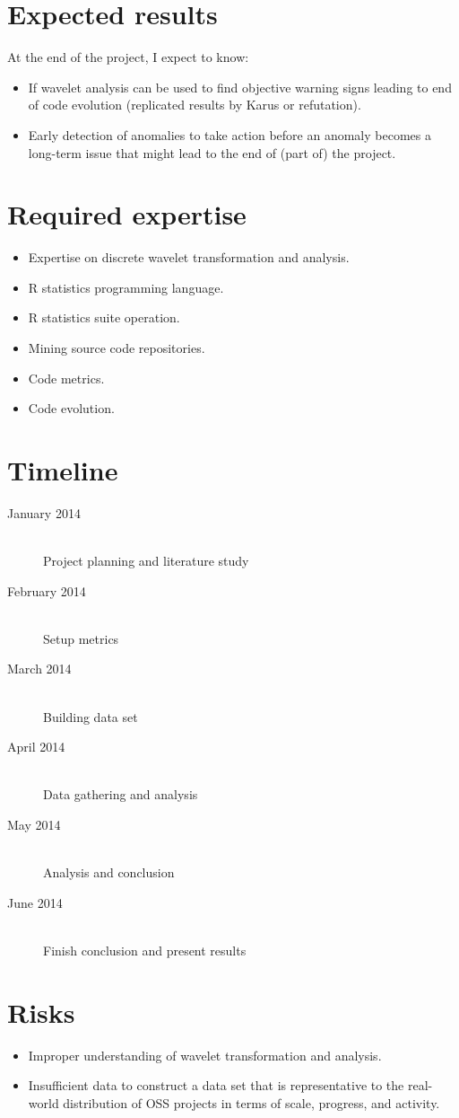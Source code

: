 


\section{Expected results}
At the end of the project, I expect to know:
\begin{itemize}
	\item If wavelet analysis can be used to find objective warning signs leading
	to end of code evolution (replicated results by Karus or refutation).
	\item Early detection of anomalies to take action before an anomaly becomes a
	long-term issue that might lead to the end of (part of) the project.
\end{itemize}

\section{Required expertise}
\begin{itemize}
	\item Expertise on discrete wavelet transformation and analysis.
	\item R statistics programming language.
	\item R statistics suite operation.
	\item Mining source code repositories.
	\item Code metrics.
	\item Code evolution.
\end{itemize}

\section{Timeline}
\begin{description}
	\item[January 2014] \hfill \\ Project planning and literature study
	\item[February 2014] \hfill \\ Setup metrics
	\item[March 2014] \hfill \\ Building data set
	\item[April 2014] \hfill \\ Data gathering and analysis
	\item[May 2014] \hfill \\ Analysis and conclusion
	\item[June 2014] \hfill \\ Finish conclusion and present results
\end{description}

\section{Risks}
\begin{itemize}
	\item Improper understanding of wavelet transformation and analysis.
	\item Insufficient data to construct a data set that is representative to the
	real-world distribution of OSS projects in terms of scale, progress, and
	activity.
\end{itemize}